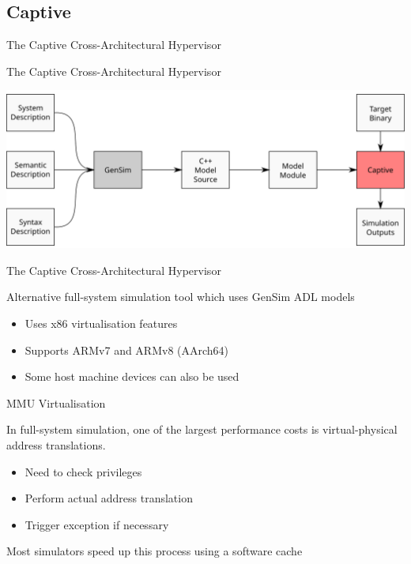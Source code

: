 \subsection{Captive}

\begin{frame}{The Captive Cross-Architectural Hypervisor}

\end{frame}

\begin{frame}{The Captive Cross-Architectural Hypervisor}

\centering
\includegraphics[width=\textwidth]{figures/gensim-toolflow-captive}

\end{frame}

\begin{frame}{The Captive Cross-Architectural Hypervisor}

Alternative full-system simulation tool which uses GenSim ADL models

\begin{itemize}
	\item Uses x86 virtualisation features
	\item Supports ARMv7 and ARMv8 (AArch64)
	\item Some host machine devices can also be used
\end{itemize}

\end{frame}

\begin{frame}{MMU Virtualisation}

In full-system simulation, one of the largest performance costs is virtual-physical address translations.

\begin{itemize}
	\item Need to check privileges
	\item Perform actual address translation
	\item Trigger exception if necessary
\end{itemize}

Most simulators speed up this process using a software cache

\end{frame}

